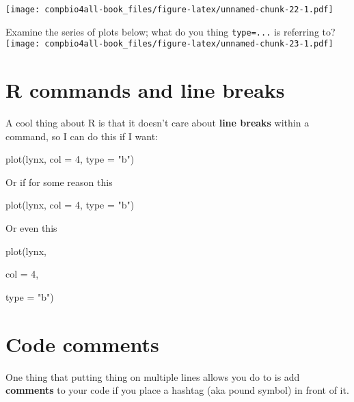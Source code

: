 \documentclass[
]{book}
\newenvironment{Shaded}{\begin{snugshade}}{\end{snugshade}}
\newcommand{\AttributeTok}[1]{\textcolor[rgb]{0.77,0.63,0.00}{#1}}
\newcommand{\DecValTok}[1]{\textcolor[rgb]{0.00,0.00,0.81}{#1}}
\newcommand{\FunctionTok}[1]{\textcolor[rgb]{0.00,0.00,0.00}{#1}}
\newcommand{\NormalTok}[1]{#1}
\newcommand{\StringTok}[1]{\textcolor[rgb]{0.31,0.60,0.02}{#1}}
\begin{document}
\texttt{[image: compbio4all-book\_files/figure-latex/unnamed-chunk-22-1.pdf]}

Examine the series of plots below; what do you thing \texttt{type=...} is referring to?
\texttt{[image: compbio4all-book\_files/figure-latex/unnamed-chunk-23-1.pdf]}

\hypertarget{r-commands-and-line-breaks}{%
\section{R commands and line breaks}\label{r-commands-and-line-breaks}}

A cool thing about R is that it doesn't care about \textbf{line breaks} within a command, so I can do this if I want:

\begin{Shaded}
\begin{Highlighting}[]
\FunctionTok{plot}\NormalTok{(lynx, }
     \AttributeTok{col =} \DecValTok{4}\NormalTok{, }
     \AttributeTok{type =} \StringTok{"b"}\NormalTok{)}
\end{Highlighting}
\end{Shaded}

Or if for some reason this

\begin{Shaded}
\begin{Highlighting}[]
\FunctionTok{plot}\NormalTok{(lynx,  }\AttributeTok{col =} \DecValTok{4}\NormalTok{, }
     \AttributeTok{type =} \StringTok{"b"}\NormalTok{)}
\end{Highlighting}
\end{Shaded}

Or even this

\begin{Shaded}
\begin{Highlighting}[]
\FunctionTok{plot}\NormalTok{(lynx,  }
     
     \AttributeTok{col =} \DecValTok{4}\NormalTok{, }
     
     
     \AttributeTok{type =} \StringTok{"b"}\NormalTok{)}
\end{Highlighting}
\end{Shaded}

\hypertarget{code-comments}{%
\section{Code comments}\label{code-comments}}

One thing that putting thing on multiple lines allows you do to is add \textbf{comments} to your code if you place a hashtag (aka pound symbol) in front of it.
\end{document}
